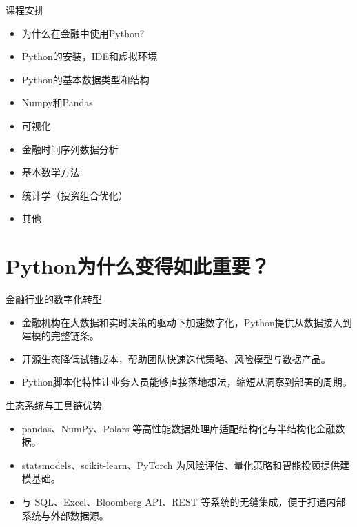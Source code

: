 \documentclass[9pt]{ctexbeamer}
\begin{document}
\begin{frame}{课程安排}

	\begin{itemize}
		\item 为什么在金融中使用Python?
		\item Python的安装，IDE和虚拟环境
		\item Python的基本数据类型和结构
		\item Numpy和Pandas
		\item 可视化
		\item 金融时间序列数据分析
		\item 基本数学方法
		\item 统计学（投资组合优化）
		\item 其他
	\end{itemize}
\end{frame}


\section{Python为什么变得如此重要？}

\begin{frame}{金融行业的数字化转型}
    \begin{itemize}
        \item 金融机构在大数据和实时决策的驱动下加速数字化，Python提供从数据接入到建模的完整链条。
        \item 开源生态降低试错成本，帮助团队快速迭代策略、风险模型与数据产品。
        \item Python脚本化特性让业务人员能够直接落地想法，缩短从洞察到部署的周期。
    \end{itemize}
\end{frame}

\begin{frame}{生态系统与工具链优势}
    \begin{itemize}
        \item pandas、NumPy、Polars 等高性能数据处理库适配结构化与半结构化金融数据。
        \item statsmodels、scikit-learn、PyTorch 为风险评估、量化策略和智能投顾提供建模基础。
        \item 与 SQL、Excel、Bloomberg API、REST 等系统的无缝集成，便于打通内部系统与外部数据源。
    \end{itemize}
\end{frame}
\end{document}
